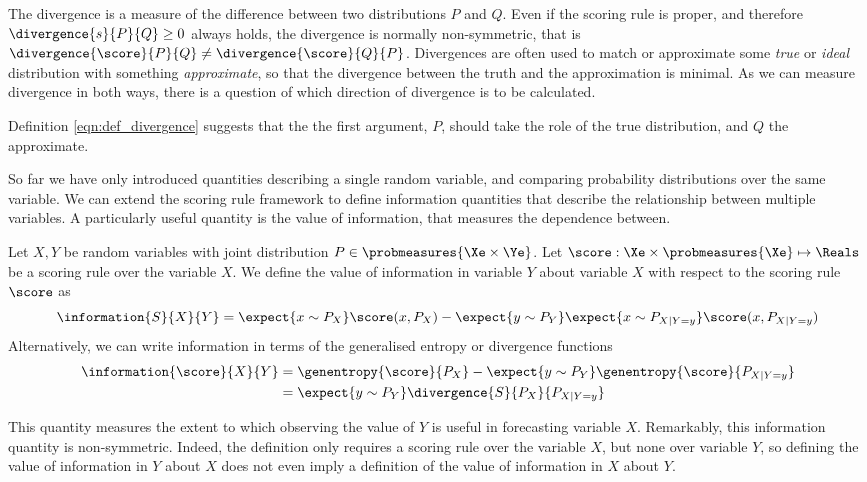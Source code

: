 The divergence is a measure of the difference between two distributions $P$ and $Q$. Even if the scoring rule is proper, and therefore $\divergence{s}{P}{Q} \geq 0$ always holds, the divergence is normally non-symmetric, that is $\divergence{\score}{P}{Q} \neq \divergence{\score}{Q}{P}$. Divergences are often used to match or approximate some \emph{true} or \emph{ideal} distribution with something \emph{approximate}, so that the divergence between the truth and the approximation is minimal. As we can measure divergence in both ways, there is a question of which direction of divergence is to be calculated.

Definition \eqref{eqn:def_divergence} suggests that the the first argument, $P$, should take the role of the true distribution, and $Q$ the approximate. 

So far we have only introduced quantities describing a single random variable, and comparing probability distributions over the same variable. We can extend the scoring rule framework to define information quantities that describe the relationship between multiple variables. A particularly useful quantity is the value of information, that measures the dependence between.

\begin{definition}
	Let $X,Y$ be random variables with joint distribution $P\in\probmeasures{\Xe\times\Ye}$. Let $\score:\Xe\times\probmeasures{\Xe}\mapsto\Reals$ be a scoring rule over the variable $X$. We define the value of information in variable $Y$ about variable $X$ with respect to the scoring rule $\score$ as
	\begin{equation}
		\information{S}{X}{Y} =  \expect{x\sim P_{X}}\score(x,P_{X})- \expect{y\sim P_{Y}} \expect{x\sim P_{X\vert Y=y}}\score(x,P_{X\vert Y=y})
	\end{equation}
	Alternatively, we can write information in terms of the generalised entropy or divergence functions
		\begin{align}
			\information{\score}{X}{Y} &=  \genentropy{\score}{P_{X}} - \expect{y \sim P_{Y}} \genentropy{\score}{P_{X\vert Y=y}}\\
				&= \expect{y\sim P_{Y}}\divergence{S}{P_{X}}{P_{X\vert Y=y}}
		\end{align}
\end{definition}

This quantity measures the extent to which observing the value of $Y$ is useful in forecasting variable $X$. Remarkably, this information quantity is non-symmetric. Indeed, the definition only requires a scoring rule over the variable $X$, but none over variable $Y$, so defining the value of information in $Y$ about $X$ does not even imply a definition of the value of information in $X$ about $Y$.

